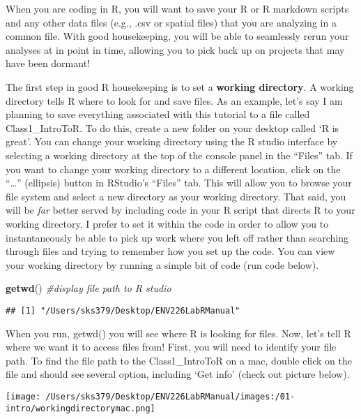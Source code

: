 \documentclass[
]{book}
\newenvironment{Shaded}{\begin{snugshade}}{\end{snugshade}}
\newcommand{\CommentTok}[1]{\textcolor[rgb]{0.56,0.35,0.01}{\textit{#1}}}
\newcommand{\FunctionTok}[1]{\textcolor[rgb]{0.13,0.29,0.53}{\textbf{#1}}}
\newcommand{\NormalTok}[1]{#1}
\begin{document}
When you are coding in R, you will want to save your R or R markdown scripts and any other data files (e.g., .csv or spatial files) that you are analyzing in a common file. With good housekeeping, you will be able to seamlessly rerun your analyses at in point in time, allowing you to pick back up on projects that may have been dormant!

The first step in good R housekeeping is to set a \textbf{working directory}. A working directory tells R where to look for and save files. As an example, let's say I am planning to save everything associated with this tutorial to a file called Class1\_IntroToR. To do this, create a new folder on your desktop called `R is great'. You can change your working directory using the R studio interface by selecting a working directory at the top of the console panel in the ``Files'' tab. If you want to change your working directory to a different location, click on the ``\ldots{}'' (ellipsis) button in RStudio's ``Files'' tab. This will allow you to browse your file system and select a new directory as your working directory. That said, you will be \emph{far} better served by including code in your R script that directs R to your working directory. I prefer to set it within the code in order to allow you to instantaneously be able to pick up work where you left off rather than searching through files and trying to remember how you set up the code. You can view your working directory by running a simple bit of code (run code below).

\begin{Shaded}
\begin{Highlighting}[]
\FunctionTok{getwd}\NormalTok{() }\CommentTok{\#display file path to R studio }
\end{Highlighting}
\end{Shaded}

\begin{verbatim}
## [1] "/Users/sks379/Desktop/ENV226LabRManual"
\end{verbatim}

When you run, getwd() you will see where R is looking for files. Now, let's tell R where we want it to access files from! First, you will need to identify your file path. To find the file path to the Class1\_IntroToR on a mac, double click on the file and should see several option, including `Get info' (check out picture below).

\texttt{[image: /Users/sks379/Desktop/ENV226LabRManual/images:/01-intro/workingdirectorymac.png]}
\end{document}
